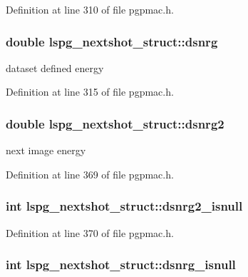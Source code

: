 Definition at line 310 of file pgpmac.\-h.

\hypertarget{structlspg__nextshot__struct_a371e574055fec7660b8f2e637eaf9f25}{
\subsubsection[{dsnrg}]{\setlength{\rightskip}{0pt plus 5cm}double lspg\-\_\-nextshot\-\_\-struct\-::dsnrg}}\label{structlspg__nextshot__struct_a371e574055fec7660b8f2e637eaf9f25}


dataset defined energy 



Definition at line 315 of file pgpmac.\-h.

\hypertarget{structlspg__nextshot__struct_ae461439c2af31255227765c0fb61850f}{
\subsubsection[{dsnrg2}]{\setlength{\rightskip}{0pt plus 5cm}double lspg\-\_\-nextshot\-\_\-struct\-::dsnrg2}}\label{structlspg__nextshot__struct_ae461439c2af31255227765c0fb61850f}


next image energy 



Definition at line 369 of file pgpmac.\-h.

\hypertarget{structlspg__nextshot__struct_aee9f8196dd9bcea832a60f2f0ea3a999}{
\subsubsection[{dsnrg2\-\_\-isnull}]{\setlength{\rightskip}{0pt plus 5cm}int lspg\-\_\-nextshot\-\_\-struct\-::dsnrg2\-\_\-isnull}}\label{structlspg__nextshot__struct_aee9f8196dd9bcea832a60f2f0ea3a999}


Definition at line 370 of file pgpmac.\-h.

\hypertarget{structlspg__nextshot__struct_ad14d8bb50290ec12e58f4aaec5cc5aab}{
\subsubsection[{dsnrg\-\_\-isnull}]{\setlength{\rightskip}{0pt plus 5cm}int lspg\-\_\-nextshot\-\_\-struct\-::dsnrg\-\_\-isnull}}\label{structlspg__nextshot__struct_ad14d8bb50290ec12e58f4aaec5cc5aab}


